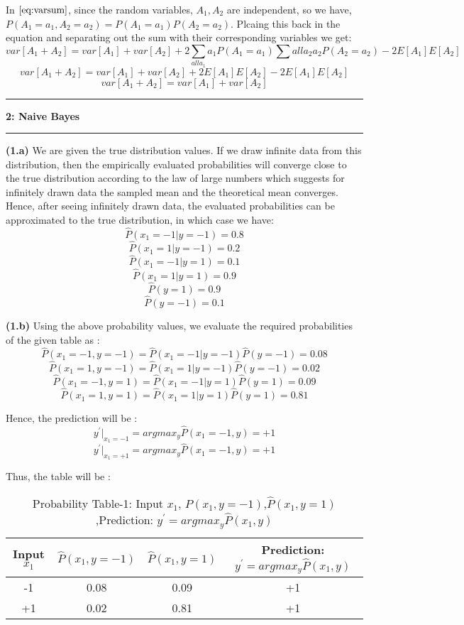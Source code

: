 \documentclass{article}
\newcommand\question[2]{\vspace{.25in}\hrule\textbf{#1: #2}\hrule\vspace{.10in}}
\renewcommand\part[1]{\vspace{.10in}\textbf{(#1)}}
\begin{document}
  In $\eqref{eq:varsum}$, since the random variables, $A_1,A_2$ are independent, so we have, $P(A_1=a_1, A_2=a_2) = P(A_1=a_1)P(A_2=a_2)$. Plcaing this back in the equation and separating out the sum with their corresponding variables we get: 
  \[var[A_1 + A_2] = var[A_1] + var[A_2] + 2\sum_{all a_1}a_1P(A_1=a_1)\sum{all a_2}a_2P(A_2 = a_2) - 2E[A_1]E[A_2]\]
  \[var[A_1 + A_2] = var[A_1] + var[A_2] + 2E[A_1]E[A_2] - 2E[A_1]E[A_2]\]
  \[var[A_1 + A_2] = var[A_1] + var[A_2] \]

  \question{2}{Naive Bayes}
  \part{1.a} We are given the true distribution values. If we draw infinite data from this distribution, then the empirically evaluated probabilities will converge close to the true distribution according to the law of large numbers which suggests for infinitely drawn data the sampled mean and the theoretical mean converges. Hence, after seeing infinitely drawn data, the evaluated probabilities can be approximated to the true distribution, in which case we have:
  \[\hat{P}(x_1 = -1| y = -1) = 0.8\]
  \[\hat{P}(x_1 = 1| y = -1) = 0.2\]
  \[\hat{P}(x_1 = -1| y = 1) = 0.1\]
  \[\hat{P}(x_1 = 1| y = 1) = 0.9\]
  \[\hat{P}(y=1) = 0.9 \]
  \[\hat{P}(y=-1) = 0.1 \]

  \part{1.b} Using the above probability values, we evaluate the required probabilities of the given table as :
  \[\hat{P}(x_1 = -1, y = -1) = \hat{P}(x_1 = -1| y = -1)\hat{P}(y= -1) = 0.08\]
  \[\hat{P}(x_1 = 1, y = -1) = \hat{P}(x_1 = 1| y = -1)\hat{P}(y= -1) = 0.02\]
  \[\hat{P}(x_1 = -1, y = 1) = \hat{P}(x_1 = -1| y = 1)\hat{P}(y= 1) = 0.09\]
  \[\hat{P}(x_1 = 1, y = 1) = \hat{P}(x_1 = 1| y = 1)\hat{P}(y= 1) = 0.81\]

  Hence, the prediction will be : 
  \[y^\prime\bigg |_{x_1=-1} = argmax_y\hat{P}(x_1=-1,y) = +1\]
  \[y^\prime\bigg |_{x_1=+1} = argmax_y\hat{P}(x_1=-1,y) = +1\]

  Thus, the table will be :
\begin{longtable}{c|c|c|c}
	\caption{Probability Table-1: Input $x_1$, $\hat{P}(x_1,y=-1)$,$\hat{P}(x_1,y=1)$ ,Prediction: $y^\prime = arg max_y \hat{P}(x_1,y)$} \\
  \hline\hline
	  Input $x_1$ & $\hat{P}(x_1,y=-1)$ & $\hat{P}(x_1,y=1)$  & Prediction: $y^\prime = arg max_y \hat{P}(x_1,y)$ \\ [0.5ex]
  \hline
	  -1 & 0.08 & 0.09 & +1  \\
	  +1 & 0.02 & 0.81 & +1 \\
  \end{longtable}
\end{document}
